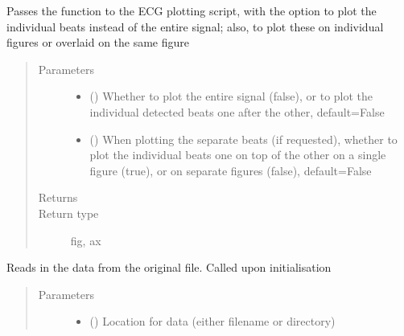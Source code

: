 \documentclass[letterpaper,10pt,english]{sphinxmanual}
\begin{document}
\begin{fulllineitems}
\begin{fulllineitems}
\sphinxAtStartPar
Passes the function to the ECG plotting script, with the option to plot the individual beats instead of the
entire signal; also, to plot these on individual figures or overlaid on the same figure
\begin{quote}\begin{description}
\item[{Parameters}] \leavevmode\begin{itemize}
\item {} 
\sphinxAtStartPar
{} (\sphinxstyleliteralemphasis{\sphinxupquote{, }}) \textendash{} Whether to plot the entire signal (false), or to plot the individual detected beats one after the other,
default=False

\item {} 
\sphinxAtStartPar
{} (\sphinxstyleliteralemphasis{\sphinxupquote{, }}) \textendash{} When plotting the separate beats (if requested), whether to plot the individual beats one on top of the
other on a single figure (true), or on separate figures (false), default=False

\end{itemize}

\item[{Returns}] \leavevmode
\sphinxAtStartPar


\item[{Return type}] \leavevmode
\sphinxAtStartPar
fig, ax

\end{description}\end{quote}

\end{fulllineitems}


\begin{fulllineitems}
\label{\detokenize{_autosummary/signalanalysis.ecg.Ecg:id4}}
\sphinxAtStartPar
Reads in the data from the original file. Called upon initialisation
\begin{quote}\begin{description}
\item[{Parameters}] \leavevmode\begin{itemize}
\item {} 
\sphinxAtStartPar
{} () \textendash{} Location for data (either filename or directory)


\end{itemize}
\end{description}
\end{quote}
\end{fulllineitems}
\end{fulllineitems}
\end{document}
